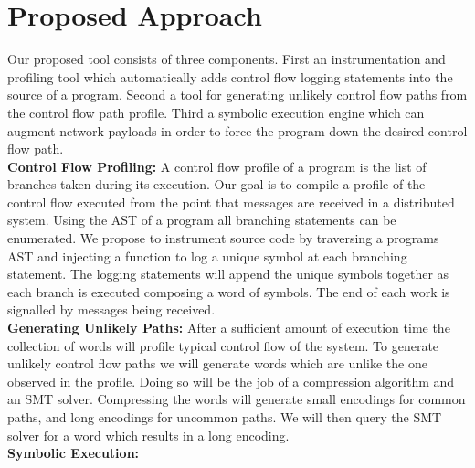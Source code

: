 \section{Proposed Approach}
\label{sec:proposed-approach}

Our proposed tool consists of three components. First an
instrumentation and profiling tool which automatically adds control
flow logging statements into the source of a program. Second a tool
for generating unlikely control flow paths from the control flow path
profile. Third a symbolic execution engine which can augment network
payloads in order to force the program down the desired control flow
path.
\\
\noindent\textbf{Control Flow Profiling:} A control flow profile of a program
is the list of branches taken during its execution. Our goal is to
compile a profile of the control flow executed from the point that
messages are received in a distributed system. Using the AST of a
program all branching statements can be enumerated. We propose to
instrument source code by traversing a programs AST and injecting a
function to log a unique symbol at each branching statement. The
logging statements will append the unique symbols together as each
branch is executed composing a word of symbols. The end of each work is
signalled by messages being received. 
\\
\noindent\textbf{Generating Unlikely Paths:} After a sufficient amount of
execution time the collection of words will profile typical control
flow of the system. To generate unlikely control flow paths we will
generate words which are unlike the one observed in the profile. Doing
so will be the job of a compression algorithm and an SMT solver.
Compressing the words will generate small encodings for common paths,
and long encodings for uncommon paths. We will then query the SMT
solver for a word which results in a long encoding.
\\
\noindent\textbf{Symbolic Execution:}
